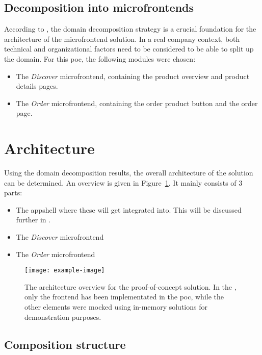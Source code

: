 \subsection{Decomposition into microfrontends}

According to \textcite{Rappl_2021}, the domain decomposition strategy is a
crucial foundation for the architecture of the \gls{microfrontend} solution. In
a real company context, both technical and organizational factors need to be
considered to be able to split up the domain. For this \gls{poc}, the following
modules were chosen:

\begin{itemize}
  \item The \textit{Discover} \gls{microfrontend}, containing the product
  overview and product details pages.
  \item The \textit{Order} \gls{microfrontend}, containing the order product
  button and the order page.
\end{itemize}

\section{Architecture}

Using the domain decomposition results, the overall architecture of the solution
can be determined. An overview is given in Figure~\ref{fig:poc-architecture}. It
mainly consists of 3 parts:
\begin{itemize}
  \item The \gls{appshell} where these 
  will get integrated into. This will be discussed further in
  .
  \item The \textit{Discover} \gls{microfrontend}
  \item The \textit{Order} \gls{microfrontend}
\end{itemize}
 

\begin{figure}
  \centering
  \texttt{[image: example-image]}  %
  \caption[Architecture overview for proof-of-concept solution]{The architecture
  overview for the proof-of-concept solution. In the ,
  only the \gls{frontend} has been implementated in the \gls{poc}, while the
  other elements were mocked using in-memory solutions for demonstration
  purposes.
  }
  \label{fig:poc-architecture}
\end{figure}


\subsection{Composition structure}
\label{ssec:poc-composition}

